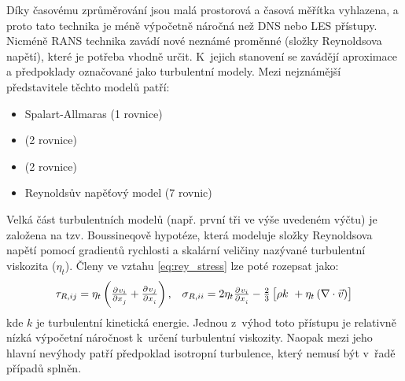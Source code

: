 Díky časovému zprůměrování jsou malá prostorová a časová měřítka vyhlazena, a proto tato technika je méně výpočetně náročná než DNS nebo LES přístupy. Nicméně RANS technika zavádí nové neznámé proměnné (složky Reynoldsova napětí), které je potřeba vhodně určit. K~jejich stanovení se zavádějí aproximace a předpoklady označované jako turbulentní modely. Mezi nejznámější představitele těchto modelů patří: 
\begin{itemize}[itemsep=0pt,parsep=0pt,partopsep=0pt,topsep=0pt]
  \item Spalart-Allmaras (1 rovnice) 
  \item \keps{} (2 rovnice) 
  \item \komg{} (2 rovnice) 
  \item Reynoldsův napěťový model (7 rovnic)
\end{itemize}
Velká část turbulentních modelů (např. první tři ve výše uvedeném výčtu) je založena na tzv. Boussineqově hypotéze, která modeluje složky Reynoldsova napětí pomocí gradientů rychlosti a skalární veličiny nazývané turbulentní viskozita ($\eta_{t}$). Členy ve vztahu \ref{eq:rey_stress} lze poté rozepsat jako: 
\begin{equation}
    \begin{array}{cc}
      \tau_{R,ij} = \eta_{t}\left( \pd{v_{i}}{x_{j}} + \pd{v_{j}}{x_{i}} \right), & \sigma_{R,ii} = 2\eta_{t}\pd{v_{i}}{x_{i}}  - \frac{2}{3} \left[ \rho k~+ \eta_{t} \left( \nabla  \cdot \vec{v} \right) \right]
      \end{array}
      \label{eq:rey_stress_bus}
\end{equation}
kde $k$ je turbulentní kinetická energie. Jednou z~výhod toto přístupu je relativně nízká výpočetní náročnost k~určení turbulentní viskozity. Naopak mezi jeho hlavní nevýhody patří předpoklad isotropní turbulence, který nemusí být v~řadě případů splněn.  

